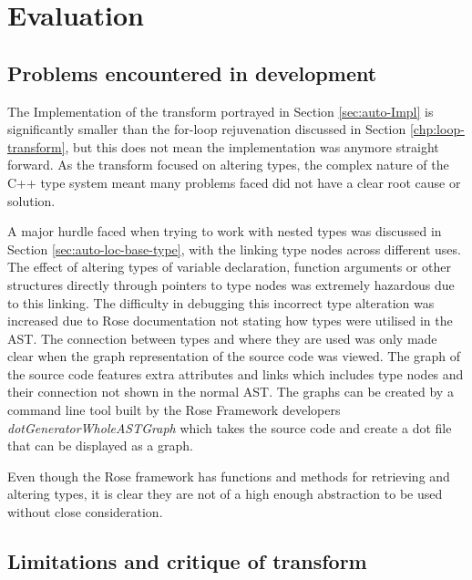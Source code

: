 \documentclass[bsc,frontabs,singlespacing,twoside,parskip,deptreport]{infthesis}
\begin{document}
\section{Evaluation} %

\subsection{Problems encountered in development}\label{sec:probs-in-auto-dev}

The Implementation of the transform portrayed in Section \ref{sec:auto-Impl} is significantly smaller than the for-loop rejuvenation discussed in Section \ref{chp:loop-transform}, but this does not mean the implementation was anymore straight forward. As the transform focused on altering types, the complex nature of the C++ type system meant many problems faced did not have a clear root cause or solution.

A major hurdle faced when trying to work with nested types was discussed in Section \ref{sec:auto-loc-base-type}, with the linking type nodes across different uses. The effect of altering types of variable declaration, function arguments or other structures directly through pointers to type nodes was extremely hazardous due to this linking. The difficulty in debugging this incorrect type alteration was increased due to Rose documentation not stating how types were utilised in the AST. The connection between types and where they are used was only made clear when the graph representation of the source code was viewed. The graph of the source code features extra attributes and links which includes type nodes and their connection not shown in the normal AST. The graphs can be created by a command line tool built by the Rose Framework developers \textit{dotGeneratorWholeASTGraph} \cite{ROSE_TUT} which takes the source code and create a dot file that can be displayed as a graph.

Even though the Rose framework has functions and methods for retrieving and altering types, it is clear they are not of a high enough abstraction to be used without close consideration.

\subsection{Limitations and critique of transform} 
\end{document}
